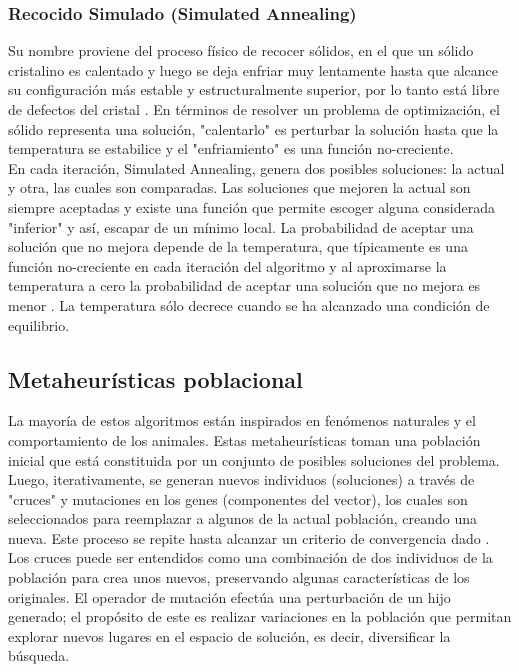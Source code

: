 \documentclass{ci5652}
\begin{document}

\subsubsection{Recocido Simulado (Simulated Annealing)}

Su nombre proviene del proceso físico de recocer sólidos, en el que un sólido cristalino es calentado y luego se deja enfriar muy lentamente hasta que alcance su configuración más estable y estructuralmente superior, por lo tanto está libre de defectos del cristal \cite{Glover_2003}. En términos de resolver un problema de optimización, el sólido representa una solución, "calentarlo" es perturbar la solución hasta que la temperatura se estabilice y el "enfriamiento" es una función no-creciente.\\

En cada iteración, Simulated Annealing, genera dos posibles soluciones: la actual y otra, las cuales son comparadas. Las soluciones que mejoren la actual son siempre aceptadas y existe una función que permite escoger alguna considerada "inferior" y así, escapar de un mínimo local. La probabilidad de aceptar una solución que no mejora depende de la temperatura, que típicamente es una función no-creciente en cada iteración del algoritmo y al aproximarse la temperatura a cero la probabilidad de aceptar una solución que no mejora es menor \cite{Glover_2003}. La temperatura sólo decrece cuando se ha alcanzado una condición de equilibrio.\\ 




\subsection{Metaheurísticas poblacional}

La mayoría de estos algoritmos están inspirados en fenómenos naturales y el
comportamiento de los animales. Estas metaheurísticas toman una población
inicial que está constituida por un conjunto de posibles soluciones del 
problema. Luego, iterativamente, se generan nuevos individuos (soluciones) a
través de "cruces" y mutaciones en los genes (componentes del vector), los 
cuales son seleccionados para reemplazar a algunos de la actual población,
creando una nueva. Este proceso se repite hasta alcanzar un criterio de 
convergencia dado \cite{Talbi_2009}.\\ 

Los cruces puede ser entendidos como una combinación de dos individuos de la
población para crea unos nuevos, preservando algunas características de los
originales. El operador de mutación efectúa una perturbación de un hijo 
generado; el propósito de este es realizar variaciones en la población que
permitan explorar nuevos lugares en el espacio de solución, es decir, 
diversificar la búsqueda. 
\end{document}
